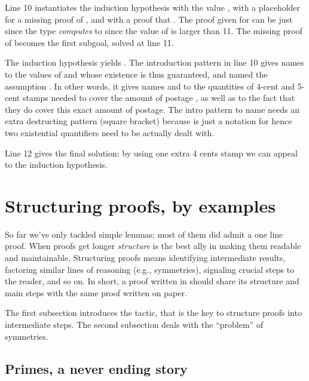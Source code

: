 Line 10 instantiates the induction hypothesis with the value
, with a placeholder for a missing proof of ,
and with a proof that . The proof given for
 can be just  since the type  
\emph{computes} to  since the value of  is larger than 11.
The missing proof
of   becomes the first
subgoal, solved at line 11.

The induction hypothesis yields
. The introduction
pattern in line 10 gives names to the values of  and 
whose existence is thus guaranteed, and named  the
assumption
. In other words, it gives names  and
 to the quantities of 4-cent and 5-cent stamps needed to cover
the amount of postage , as well as to the fact that they do
cover this exact amount of postage. The intro pattern to name
 needs an extra destructing pattern (square bracket) because
 is just a notation for
 hence two existential
quantifiers need to be actually dealt with.

Line 12 gives the final solution: by using one extra 4 cents stamp
we can appeal to the induction hypothesis.


\section{Structuring proofs, by examples}

So far we've only tackled simple lemmas; most of them did admit a one line
proof.  When proofs get longer \emph{structure} is the best ally in making
them readable and maintainable.  Structuring proofs means identifying
intermediate results, factoring similar lines of reasoning (e.g., symmetries),
signaling crucial steps to the reader, and so on.  In short, a
proof written in \Coq{} should share its structure and main steps
with the same proof written on paper.

The first subsection introduces the  tactic, that is the key
to structure proofs into intermediate steps.  The second subsection
deals with the ``problem'' of symmetries.

\subsection{Primes, a never ending story}\label{sec:infprimes}


